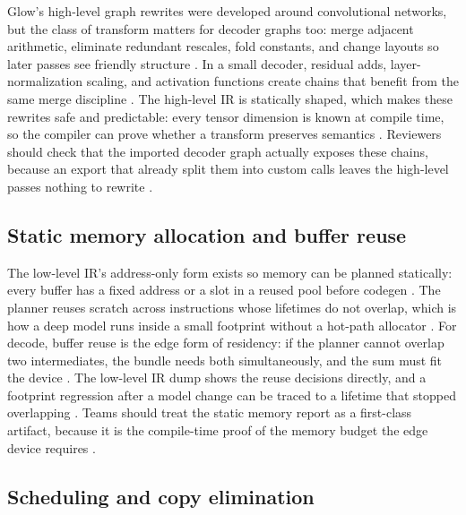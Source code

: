 Glow's high-level graph rewrites were developed around convolutional networks, but the class of transform matters for decoder graphs too: merge adjacent arithmetic, eliminate redundant rescales, fold constants, and change layouts so later passes see friendly structure \citep{rotem2018glow,chen2020compilerbasedhardw}. In a small decoder, residual adds, layer-normalization scaling, and activation functions create chains that benefit from the same merge discipline \citep{dao2022flashattention,memoryfloor2026}. The high-level IR is statically shaped, which makes these rewrites safe and predictable: every tensor dimension is known at compile time, so the compiler can prove whether a transform preserves semantics \citep{rotem2018glow,patel2025llminference}. Reviewers should check that the imported decoder graph actually exposes these chains, because an export that already split them into custom calls leaves the high-level passes nothing to rewrite \citep{chen2020compilerbasedhardw,patel2025llminference}.

\subsection{Static memory allocation and buffer reuse}

The low-level IR's address-only form exists so memory can be planned statically: every buffer has a fixed address or a slot in a reused pool before codegen \citep{rotem2018glow,memoryfloor2026}. The planner reuses scratch across instructions whose lifetimes do not overlap, which is how a deep model runs inside a small footprint without a hot-path allocator \citep{rotem2018glow,dlbook}. For decode, buffer reuse is the edge form of residency: if the planner cannot overlap two intermediates, the bundle needs both simultaneously, and the sum must fit the device \citep{memoryfloor2026,taxbreak2026}. The low-level IR dump shows the reuse decisions directly, and a footprint regression after a model change can be traced to a lifetime that stopped overlapping \citep{rotem2018glow,chen2020compilerbasedhardw}. Teams should treat the static memory report as a first-class artifact, because it is the compile-time proof of the memory budget the edge device requires \citep{amd2024aie,memoryfloor2026}.

\subsection{Scheduling and copy elimination}


